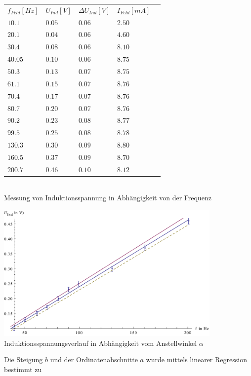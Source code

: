 \documentclass{article}
\begin{document}
\begin{center}

\begin{tabular}{l l l l l}
\(f_{Feld}[Hz]\) & \(U_{Ind}[V]\) & \(\Delta U_{Ind}[V]\) & \(I_{Feld}[mA]\) \\
\(10.1\) & \(0.05\) & \(0.06\) & \(2.50\) \\
\(20.1\) & \(0.04\)  & \(0.06\) & \(4.60\) \\
\(30.4\) & \(0.08\)  & \(0.06\) & \(8.10\) \\
\(40.05\) & \(0.10\)  & \(0.06\) & \(8.75\) \\
\(50.3\) & \(0.13\)  & \(0.07\) & \(8.75\) \\
\(61.1\) & \(0.15\)  & \(0.07\) & \(8.76\) \\
\(70.4\) & \(0.17\)  & \(0.07\) & \(8.76\) \\
\(80.7\) & \(0.20\)  & \(0.07\) & \(8.76\) \\
\(90.2\) & \(0.23\)  & \(0.08\) & \(8.77\) \\
\(99.5\) & \(0.25\)  & \(0.08\) & \(8.78\) \\
\(130.3\) & \(0.30\)  & \(0.09\) & \(8.80\) \\
\(160.5\) & \(0.37\)  & \(0.09\) & \(8.70\) \\
\(200.7\) & \(0.46\)  & \(0.10\) & \(8.12\) \\
\end{tabular}\\
Messung von Induktionsspannung in Abhängigkeit von der Frequenz\\
\end{center}
\begin{center}
  \includegraphics[width=11cm]{graphen/graph3}
	Induktionsspannungsverlauf in Abhängigkeit vom Anstellwinkel \( \alpha \)
\end{center}

Die Steigung \(b\) und der Ordinatenabschnitte \(a\) wurde mittels linearer Regression bestimmt zu
\end{document}
